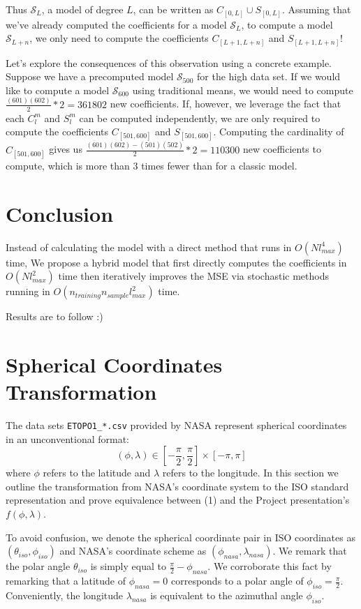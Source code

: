 \documentclass[a4paper]{article}
\theoremstyle{definition}
\begin{document}
Thus $\mathcal{S}_L$, a model of degree $L$, can be written as $C_{[0, L]} \cup S_{[0, L]}$. Assuming that we've already computed the coefficients for a model 
$\mathcal{S}_L$, to compute a model $\mathcal{S}_{L + n}$, we only need to compute the coefficients $C_{[L + 1, L + n]}$ and $S_{[L + 1, L + n]}$!

Let's explore the consequences of this observation using a concrete example. Suppose we have a precomputed model $\mathcal{S}_{500}$ for the high data set. If we would 
like to compute a model $\mathcal{S}_{600}$ using traditional means, we would need to compute $\frac{(601)(602)}{2} * 2 = 361802$ new coefficients. If, however, we leverage the fact
that each $C_l^m$ and $S_l^m$ can be computed independently, we are only required to compute the coefficients $C_{[501, 600]}$ and $S_{[501, 600]}$. Computing the cardinality of 
$C_{[501, 600]}$ gives us $\frac{(601)(602) - (501)(502)}{2} * 2 = 110300$ new coefficients to compute, which is more than 3 times fewer than for a classic model.


\section{Conclusion}

Instead of calculating the model with a direct method that runs in $O(Nl_{max}^4)$ time, We propose a hybrid model that first directly computes the coefficients in $O(Nl_{max}^2)$ time then 
iteratively improves the MSE via stochastic methods running in $O(n_{training}n_{sample}l_{max}^2)$ time.

Results are to follow :)





\appendix
\section{Spherical Coordinates Transformation}

The data sets \verb|ETOPO1_*.csv| provided by NASA represent spherical coordinates in an unconventional format: $$(\phi, \lambda) \in [-\frac{\pi}{2}, \frac{\pi}{2}] \times [-\pi, \pi] $$ where $\phi$ refers to the latitude
and $\lambda$ refers to the longitude. In this section we outline the transformation from NASA's coordinate system to the ISO standard representation and prove equivalence between (1) and the Project presentation's $f(\phi, \lambda)$.

To avoid confusion, we denote the spherical coordinate pair in ISO coordinates as $(\theta_{iso}, \phi_{iso})$ and NASA's coordinate scheme as $(\phi_{nasa}, \lambda_{nasa})$.
We remark that the polar angle $\theta_{iso}$ is simply equal to $\frac{\pi}{2} - \phi_{nasa}$. We corroborate this fact by remarking that a latitude of $\phi_{nasa} = 0$ corresponds to a polar
angle of $\phi_{iso} = \frac{\pi}{2}$. Conveniently, the longitude $\lambda_{nasa}$ is equivalent to the azimuthal angle $\phi_{iso}$.
\end{document}
